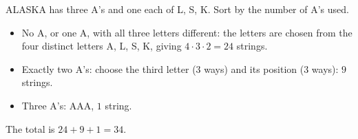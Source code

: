 ALASKA has three A's and one each of L, S, K. Sort by the number of A's used.
\begin{itemize}
\item No A, or one A, with all three letters different: the letters are chosen from the four distinct letters A, L, S, K, giving $4\cdot3\cdot2=24$ strings.
\item Exactly two A's: choose the third letter ($3$ ways) and its position ($3$ ways): $9$ strings.
\item Three A's: AAA, $1$ string.
\end{itemize}
The total is $24+9+1=\boxed{34}$.
